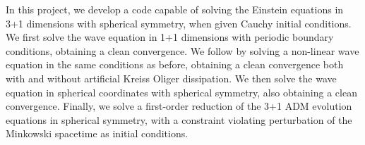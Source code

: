 In this project, we develop a code capable of solving the Einstein equations in 3+1 dimensions with spherical symmetry, when given Cauchy initial conditions. We first solve the wave equation in 1+1 dimensions with periodic boundary conditions, obtaining a clean convergence. We follow by solving a non-linear wave equation in the same conditions as before, obtaining a clean convergence both with and without artificial Kreiss Oliger dissipation. We then solve the wave equation in spherical coordinates with spherical symmetry, also obtaining a clean convergence. Finally, we solve a first-order reduction of the 3+1 ADM evolution equations in spherical symmetry, with a constraint violating perturbation of the Minkowski spacetime as initial conditions.